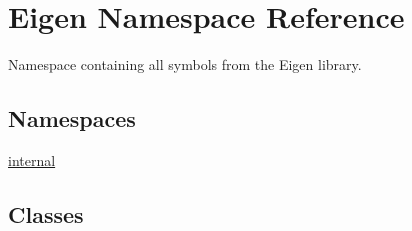 \hypertarget{namespace_eigen}{}\section{Eigen Namespace Reference}
\label{namespace_eigen}


Namespace containing all symbols from the Eigen library.  


\subsection*{Namespaces}
\begin{DoxyCompactItemize}
\item 
 \hyperlink{namespace_eigen_1_1internal}{internal}
\end{DoxyCompactItemize}
\subsection*{Classes}
